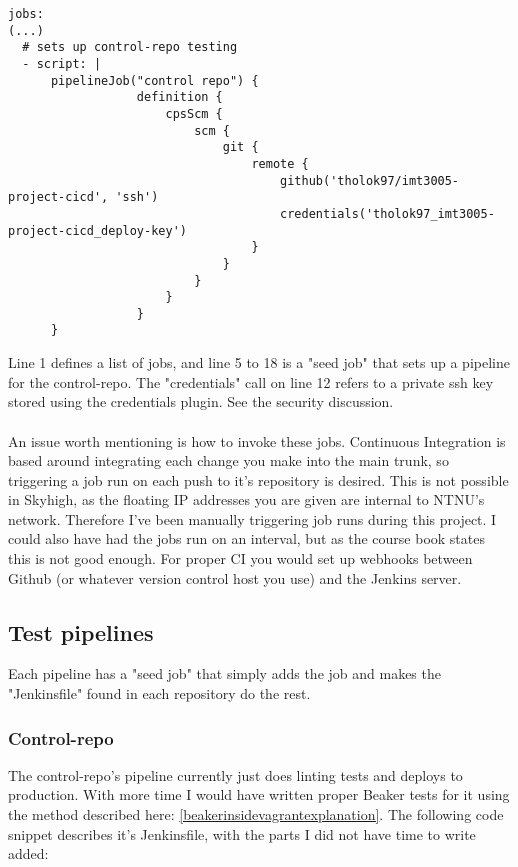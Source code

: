 \begin{verbatim}
jobs:
(...)
  # sets up control-repo testing
  - script: |
      pipelineJob("control repo") {
                  definition {
                      cpsScm {
                          scm {
                              git {
                                  remote {
                                      github('tholok97/imt3005-project-cicd', 'ssh')
                                      credentials('tholok97_imt3005-project-cicd_deploy-key')
                                  }
                              }
                          }
                      }
                  }
      }
\end{verbatim}

Line 1 defines a list of jobs, and line 5 to 18 is a "seed job" that sets up a pipeline for the control-repo. The "credentials" call on line 12 refers to a private ssh key stored using the credentials plugin. See the security discussion.
\\
\\
An issue worth mentioning is how to invoke these jobs. Continuous Integration is based around integrating each change you make into the main trunk, so triggering a job run on each push to it's repository is desired. This is not possible in Skyhigh, as the floating IP addresses you are given are internal to NTNU's network. Therefore I've been manually triggering job runs during this project. I could also have had the jobs run on an interval, but as the course book\cite{coursebook} states this is not good enough. For proper CI you would set up webhooks between Github (or whatever version control host you use) and the Jenkins server. 

\subsection{Test pipelines}

Each pipeline has a "seed job" that simply adds the job and makes the "Jenkinsfile" found in each repository do the rest. 

\subsubsection{Control-repo}

The control-repo's pipeline currently just does linting tests and deploys to production. With more time I would have written proper Beaker tests for it using the method described here: \ref{beakerinsidevagrantexplanation}. The following code snippet describes it's Jenkinsfile, with the parts I did not have time to write added:

